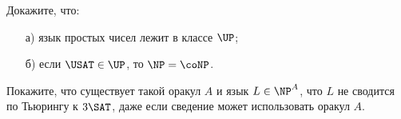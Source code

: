 \begin{ptask}{54}
    Докажите, что: 
    \begin{enumerate}[topsep = 0pt, itemsep = -1ex]
        \item [а)] язык простых чисел лежит в классе $\UP$;
        \item [б)] если $\USAT \in \UP$, то $\NP = \coNP$.
    \end{enumerate}
\end{ptask}

\begin{ptask}{55}
    Покажите, что существует такой оракул $A$ и язык $L \in \NP^A$, что $L$ не
    сводится по Тьюрингу к $3\SAT$, даже если сведение может использовать оракул $A$.
\end{ptask}